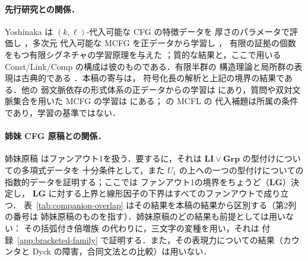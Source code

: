 \paragraph{先行研究との関係．}
Yoshinaka は $(k,\ell)$-代入可能な CFG の特徴データを
厚さのパラメータで評価し \cite{Yoshinaka2008}，多次元
代入可能な MCFG を正データから学習し \cite{Yoshinaka2009,Yoshinaka2011}，
有限の証拠の個数をもつ有限シグネチャの学習原理を与えた
\cite{Yoshinaka2015General}；質的な結果と，ここで用いる
Const/Link/Comp の構成は彼のものである．有限半群の
構造理論と局所群の表現は古典的である
\cite{Straubing1985,Tilson1987,AlmeidaEtAl2009}．本稿の寄与は，
符号化長の解析と上記の境界の結果である．他の
弱文脈依存の形式体系の正データからの学習は
\cite{OatesEtAl2006} にあり，質問や双対文脈集合を用いた MCFG の学習は
\cite{Yoshinaka2010,ClarkYoshinaka2014,KanazawaYoshinaka2023} にある；
\cite{DuncanEtAl2026Substitution} の MCFL の
代入補題は所属の条件であり，学習の基準ではない．

\paragraph{姉妹 CFG 原稿との関係．}
姉妹原稿 \cite{kuriyamaCFG} はファンアウト1を扱う．要するに，それは
$\mathbf{LI}\vee\mathbf{Grp}$ の型付けについての多項式データを
十分条件として，また $U_1$ の上への一つの型付けについての指数的データを証明する；ここでは
ファンアウト1の境界をちょうど（$\mathbf{LG}$）決定し，
$\mathbf{LG}$ に対する上界と線形因子の下界はすべてのファンアウトで成り立つ．
表~\ref{tab:companion-overlap} はその結果を本稿の結果から区別する（第2列の番号は
姉妹原稿のものを指す）．姉妹原稿のどの結果も前提としては用いない：
その括弧付き倍増族
\cite[Proposition~6.4]{kuriyamaCFG} の代わりに，三文字の変種を用い，それは
付録~\ref{app:bracketed-family} で証明する．また，その表現力についての結果（カウンタと
Dyck の障害，合同文法との比較）は用いない．

